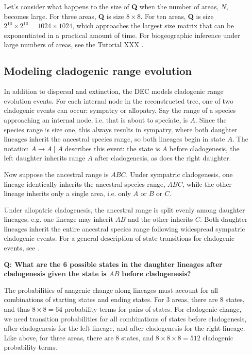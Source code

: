 Let's consider what happens to the size of \textbf{Q} when the number of areas, $N$, becomes large.
For three areas, \textbf{Q} is size $8 \times 8$.
For ten areas, \textbf{Q} is size $2^{10} \times 2^{10} = 1024 \times 1024$, which approaches the largest size matrix that can be exponentiated in a practical amount of time.
For biogeographic inference under large numbers of areas, see the Tutorial XXX \citep{landis13}.



\subsection{Modeling cladogenic range evolution}

In addition to dispersal and extinction, the DEC models cladogenic range evolution events.
For each internal node in the reconstructed tree, one of two cladogenic events can occur: sympatry or allopatry.
Say the range of a species approaching an internal node, i.e. that is about to speciate, is $A$.
Since the species range is size one, this always results in sympatry, where both daughter lineages inherit the ancestral species range, so both lineages begin in state $A$.
The notation $A \rightarrow A \mid A$ describes this event: the state is $A$ before cladogenesis, the left daughter inherits range $A$ after cladogenesis, as does the right daughter.

Now suppose the ancestral range is $ABC$.
Under sympatric cladogenesis, one lineage identically inherits the ancestral species range, $ABC$, while the other lineage inherits only a single area, i.e. only $A$ or $B$ or $C$.

Under allopatric cladogenesis, the ancestral range is split evenly among daughter lineages, e.g. one lineage may inherit $AB$ and the other inherits $C$.
Both daughter lineages inherit the entire ancestral species range following widespread sympatric cladogenic events.
For a general description of state transitions for cladogenic events, see \citet{matzke13}.

{\bf Q: What are the 6 possible states in the daughter lineages after cladogenesis given the state is $AB$ before cladogenesis?}

The probabilities of anagenic change along lineages must account for all combinations of starting states and ending states.
For 3 areas, there are 8 states, and thus $8 \times 8 = 64$ probability terms for pairs of states.
For cladogenic change, we need transition probabilities for all combinations of states before cladogenesis, after cladogenesis for the left lineage, and after cladogenesis for the right lineage.
Like above, for three areas, there are 8 states, and $8 \times 8 \times 8 = 512$ cladogenic probability terms.

